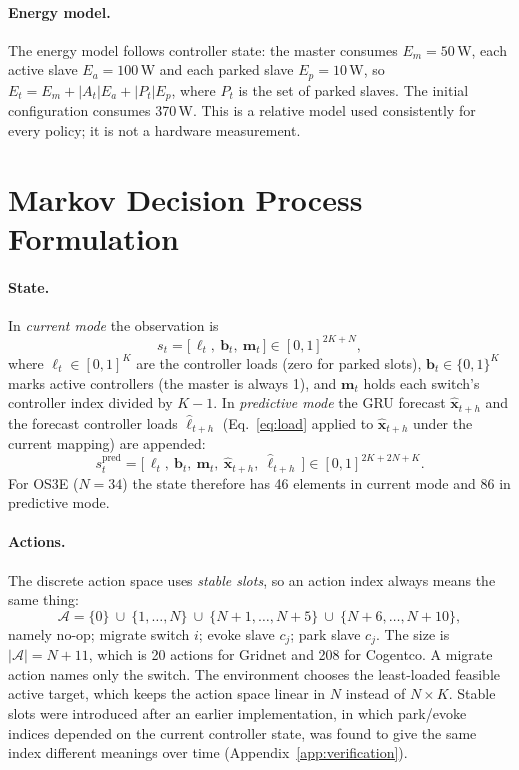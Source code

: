 \paragraph{Energy model.}
\label{sec:energy}
The energy model follows controller state: the master consumes $E_m=50$\,W, each active slave $E_a=100$\,W and each parked slave $E_p=10$\,W, so $E_t=E_m+|A_t|E_a+|P_t|E_p$, where $P_t$ is the set of parked slaves. The initial configuration consumes 370\,W. This is a relative model used consistently for every policy; it is not a hardware measurement.

\section{Markov Decision Process Formulation}
\label{sec:mdp}

\paragraph{State.} In \emph{current mode} the observation is
\begin{equation}
  s_t = \big[\,\bm{\ell}_t,\ \mathbf{b}_t,\ \mathbf{m}_t\,\big]\in[0,1]^{2K+N},
\end{equation}
where $\bm{\ell}_t\in[0,1]^K$ are the controller loads (zero for parked slots), $\mathbf{b}_t\in\{0,1\}^K$ marks active controllers (the master is always 1), and $\mathbf{m}_t$ holds each switch's controller index divided by $K-1$. In \emph{predictive mode} the GRU forecast $\hat{\mathbf{x}}_{t+h}$ and the forecast controller loads $\hat{\bm{\ell}}_{t+h}$ (Eq.~\ref{eq:load} applied to $\hat{\mathbf{x}}_{t+h}$ under the current mapping) are appended:
\begin{equation}
  s^{\text{pred}}_t = \big[\,\bm{\ell}_t,\ \mathbf{b}_t,\ \mathbf{m}_t,\ \hat{\mathbf{x}}_{t+h},\ \hat{\bm{\ell}}_{t+h}\,\big]\in[0,1]^{2K+2N+K}.
\end{equation}
For OS3E ($N=34$) the state therefore has 46 elements in current mode and 86 in predictive mode.

\paragraph{Actions.} The discrete action space uses \emph{stable slots}, so an action index always means the same thing:
\begin{equation}
  \mathcal{A}=\{0\}\ \cup\ \{1,\dots,N\}\ \cup\ \{N{+}1,\dots,N{+}5\}\ \cup\ \{N{+}6,\dots,N{+}10\},
\end{equation}
namely no-op; migrate switch $i$; evoke slave $c_j$; park slave $c_j$. The size is $|\mathcal{A}|=N+11$, which is 20 actions for Gridnet and 208 for Cogentco. A migrate action names only the switch. The environment chooses the least-loaded feasible active target, which keeps the action space linear in $N$ instead of $N\times K$. Stable slots were introduced after an earlier implementation, in which park/evoke indices depended on the current controller state, was found to give the same index different meanings over time (Appendix~\ref{app:verification}).

